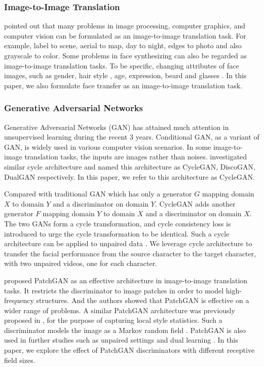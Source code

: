 \documentclass[letterpaper]{article} %
\begin{document}
	
	\subsubsection{Image-to-Image Translation}
	\cite{isola2016image} pointed out that many problems in image processing, computer graphics, and computer vision can be formulated as an image-to-image translation task. For example, label to scene, aerial to map, day to night, edges to photo and also grayscale to color. Some problems in face synthesizing can also be regarded as image-to-image translation tasks. To be specific, changing attributes of face images, such as gender, hair style \cite{kim2017unsupervised}, age, expression, beard and glasses \cite{shen2016learning}. In this paper, we also formulate face transfer as an image-to-image translation task.
	
	
	\subsubsection{Generative Adversarial Networks}
	Generative Adversarial Networks (GAN) \cite{goodfellow2014generative} has attained much attention in unsupervised learning during the recent 3 years. Conditional GAN, as a variant of GAN, is widely used in various computer vision scenarios. In some image-to-image translation tasks, the inputs are images rather than noises. \cite{zhu2017unpaired,kim2017unsupervised,yi2017dualgan} investigated similar cycle architecture and named this architecture as CycleGAN, DiscoGAN, DualGAN respectively. In this paper, we refer to this architecture as CycleGAN. 
	
	Compared with traditional GAN which has only a generator $G$ mapping domain $X$ to domain $Y$ and a discriminator on domain $Y$. CycleGAN adds another generator $F$ mapping domain $Y$ to domain $X$ and a discriminator on domain $X$. The two GANs form a cycle transformation, and cycle consistency loss is introduced to urge the cycle transformation to be identical. Such a cycle architecture can be applied to unpaired data \cite{zhu2017unpaired}. 
	We leverage cycle architecture to transfer the facial performance from the source character to the target character, with two unpaired videos, one for each character.
	
	
	\cite{isola2016image} proposed PatchGAN as an effective architecture in image-to-image translation tasks. It restricts the discriminator to image patches in order to model high-frequency structures. And the authors showed that PatchGAN is effective on a wider range of problems. A similar PatchGAN architecture was previously proposed in \cite{li2016precomputed}, for the purpose of capturing local style statistics. Such a discriminator models the image as a Markov random field \cite{li2016precomputed}. PatchGAN is also used in further studies such as unpaired settings \cite{zhu2017unpaired} and dual learning \cite{yi2017dualgan}. In this paper, we explore the effect of PatchGAN discriminators with different receptive field sizes.
	
\end{document}

